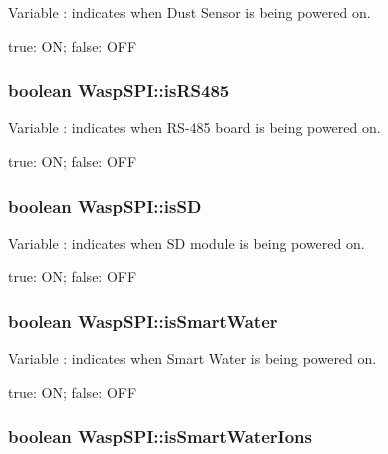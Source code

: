 Variable \+: indicates when Dust Sensor is being powered on. 

true\+: ON; false\+: O\+FF 
\subsubsection[{\texorpdfstring{is\+R\+S485}{isRS485}}]{\setlength{\rightskip}{0pt plus 5cm}boolean Wasp\+S\+P\+I\+::is\+R\+S485}\hypertarget{class_wasp_s_p_i_ab5fb0f5a6e2a31fee2edf6f6319710a6}{}\label{class_wasp_s_p_i_ab5fb0f5a6e2a31fee2edf6f6319710a6}


Variable \+: indicates when R\+S-\/485 board is being powered on. 

true\+: ON; false\+: O\+FF 
\subsubsection[{\texorpdfstring{is\+SD}{isSD}}]{\setlength{\rightskip}{0pt plus 5cm}boolean Wasp\+S\+P\+I\+::is\+SD}\hypertarget{class_wasp_s_p_i_af25524796d63dabc614299f9a0aab693}{}\label{class_wasp_s_p_i_af25524796d63dabc614299f9a0aab693}


Variable \+: indicates when SD module is being powered on. 

true\+: ON; false\+: O\+FF 
\subsubsection[{\texorpdfstring{is\+Smart\+Water}{isSmartWater}}]{\setlength{\rightskip}{0pt plus 5cm}boolean Wasp\+S\+P\+I\+::is\+Smart\+Water}\hypertarget{class_wasp_s_p_i_a925f2e476409b686e9a24c045ad9e79a}{}\label{class_wasp_s_p_i_a925f2e476409b686e9a24c045ad9e79a}


Variable \+: indicates when Smart Water is being powered on. 

true\+: ON; false\+: O\+FF 
\subsubsection[{\texorpdfstring{is\+Smart\+Water\+Ions}{isSmartWaterIons}}]{\setlength{\rightskip}{0pt plus 5cm}boolean Wasp\+S\+P\+I\+::is\+Smart\+Water\+Ions}\hypertarget{class_wasp_s_p_i_afd972ccff99b8ae3c6f9b3a15c1a92b7}{}\label{class_wasp_s_p_i_afd972ccff99b8ae3c6f9b3a15c1a92b7}


